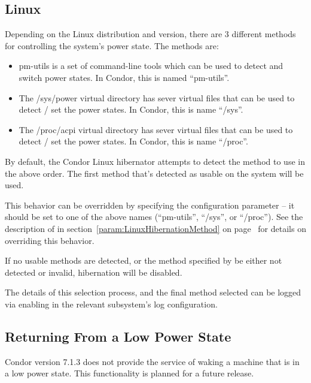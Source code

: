 \subsection{Linux}
Depending on the Linux distribution and version, there are 3 different
methods for controlling the system's power state.  The methods are:
\begin{itemize}
\item pm-utils is a set of command-line tools which can be used to
  detect and switch power states.  In Condor, this is named ``pm-utils''.
\item The /sys/power virtual directory has sever virtual files that
  can be used to detect / set the power states.  In Condor, this is
  name ``/sys''.
\item The /proc/acpi virtual directory has sever virtual files that
  can be used to detect / set the power states.  In Condor, this is
  name ``/proc''.
\end{itemize}

By default, the Condor Linux hibernator attempts to detect the method
to use in the above order.  The first method that's detected as usable
on the system will be used.

This behavior can be overridden by specifying the
 configuration parameter -- it
should be set to one of the above names (``pm-utils'', ``/sys'', or
``/proc'').
See the description of  in
section~\ref{param:LinuxHibernationMethod} on
page~\pageref{param:LinuxHibernationMethod}
for details on overriding this behavior.

If no usable methods are detected, or the method specified by
 be either not detected or
invalid, hibernation will be disabled.

The details of this selection process, and the final method selected
can be logged via enabling  in the relevant
subsystem's log configuration.


\subsection{Returning From a Low Power State}

Condor version 7.1.3 does not provide the service of waking a machine
that is in a low power state.
This functionality is planned for a future release.

